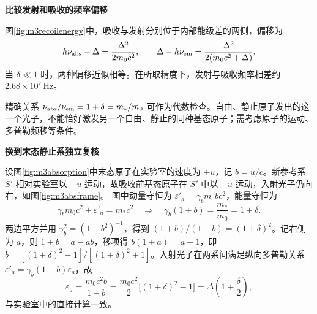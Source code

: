 \begin{solution}
\par\medskip{}\noindent\textbf{比较发射和吸收的频率偏移}\par\nobreak
图\ref{fig:m3recoilenergy}中，吸收与发射分别位于内部能级差的两侧，偏移为
\[
 h\nu_{\rm abs}-\Delta=\frac{\Delta^2}{2m_0c^2},\qquad
 \Delta-h\nu_{\rm em}=\frac{\Delta^2}{2(m_0c^2+\Delta)}.
\]
当 $\delta\ll1$ 时，两种偏移近似相等。在所取精度下，发射与吸收频率相差约 $2.68\times10^7\,\mathrm{Hz}$。

精确关系 \(\nu_{\rm abs}/\nu_{\rm em}=1+\delta=m_*/m_0\) 可作为代数检查。自由、静止原子发出的这一个光子，不能恰好激发另一个自由、静止的同种基态原子；需考虑原子的运动、多普勒频移等条件。

 

\par\medskip{}\noindent\textbf{换到末态静止系独立复核}\par\nobreak
设图\ref{fig:m3absorption}中末态原子在实验室的速度为 \(+u\)，记 \(b=u/c\)。新参考系 \(S'\) 相对实验室以 \(+u\) 运动，故吸收前基态原子在 \(S'\) 中以 \(-u\) 运动，入射光子仍向右，如图\ref{fig:m3absframe}。
图中动量守恒为 \(\varepsilon'_a=\gamma_bm_0bc^2\)，能量守恒为
\[
 \gamma_bm_0c^2+\varepsilon'_a=m_*c^2
 \quad\Longrightarrow\quad
 \gamma_b(1+b)=\frac{m_*}{m_0}=1+\delta.
\]
两边平方并用 $\gamma_b^2=(1-b^2)^{-1}$，得到 $(1+b)/(1-b)=(1+\delta)^2$。记右侧为 $a$，则 $1+b=a-ab$，移项得 $b(1+a)=a-1$，即 \(b=[(1+\delta)^2-1]/[(1+\delta)^2+1]\)。入射光子在两系间满足纵向多普勒关系
\(\varepsilon'_a=\gamma_b(1-b)\varepsilon_a\)，故
\[
 \varepsilon_a=\frac{m_0c^2b}{1-b}
 =\frac{m_0c^2}{2}\big[(1+\delta)^2-1\big]
 =\Delta\left(1+\frac\delta2\right),
\]
与实验室中的直接计算一致。
\end{solution}

